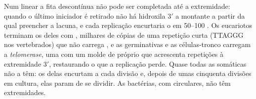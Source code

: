 \begin{proposition}\label{prop:b1:replication-mitosis:telomerase}
Num  linear a fita descontínua não pode ser completada até a
extremidade: quando o último iniciador é retirado não há hidroxila $3'$
a montante a partir da qual preencher a lacuna, e cada replicação
encurtaria o  em \qtyrange{50}{100}{} . Os
eucariotos terminam os  deles com \emph{}, milhares
de cópias de uma repetição curta (TTAGGG nos vertebrados) que não carrega
, e as  germinativas e as células-tronco carregam a
\emph{telomerase}, uma  com um molde de  próprio que acrescenta
repetições à extremidade $3'$, restaurando o que a replicação perde.
Quase todas as  somáticas não a têm: os  delas encurtam
a cada divisão e, depois de umas cinquenta divisões em cultura, elas
param de se dividir. As bactérias, com  circulares, não têm
extremidades.
\end{proposition}


